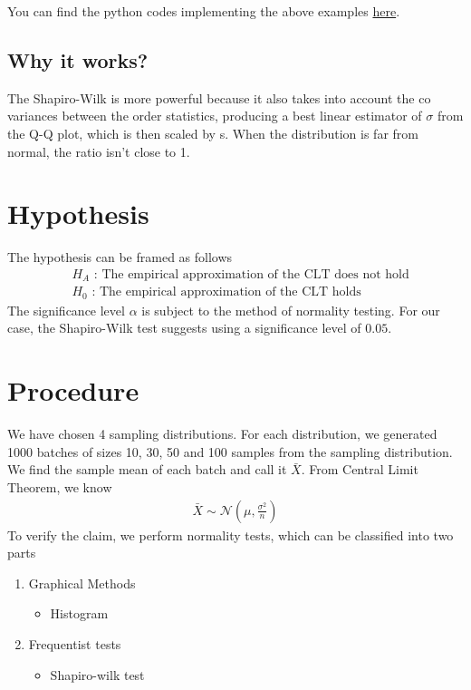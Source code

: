 \documentclass{article}
\begin{document}
\noindent You can find the python codes implementing the above examples 
\href{https://github.com/cmaspi/verifying_CLT/blob/main/codes/examples.ipynb}{here}.

\subsection{Why it works?}
The Shapiro-Wilk is more powerful because it also takes into account the co variances between the order statistics, producing a best linear estimator of $\sigma$ from the Q-Q plot, which is then scaled by s. When the distribution is far from normal, the ratio isn't close to 1.



\section{Hypothesis}
The hypothesis can be framed as follows
\begin{align}
    & H_A\text{ : The empirical approximation of the CLT does not hold} \nonumber\\
    & H_0\text{ : The empirical approximation of the CLT holds}\nonumber
\end{align}
The significance level $\alpha$ is subject to the method of normality testing. For our case, the Shapiro-Wilk test suggests using a significance level of $0.05$. 

\section{Procedure}
We have chosen 4 sampling distributions. For each distribution, we generated 1000 batches of sizes 10, 30, 50 and 100 samples from the sampling distribution. We find the sample mean of each batch and call it $\bar{X}$. From Central Limit Theorem, we know
\begin{align}
    \bar{X} \sim \mathcal{N}\left(\mu, \frac{\sigma^2}{n}\right)
\end{align}
To verify the claim, we perform normality tests, which can be classified into two parts
\begin{enumerate}
    \item Graphical Methods
    \begin{itemize}
        \item Histogram
    \end{itemize}
    \item{Frequentist tests}
    \begin{itemize}
        \item Shapiro-wilk test
    \end{itemize}
\end{enumerate}
\end{document}
